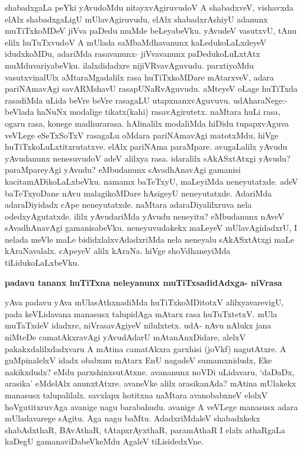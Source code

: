 \noindent
shabadxgaLa peYki yAvudoMdu nitayxvAgiruvudoV A shabadxveV, vishavxda elAlx shabadx\-gaLigU mUlavAgi\-ruvudu, elAlx shabadxrAshiyU adanunx muTiTxkoMDeV jiVva paDedu muMde beLeyabeVku. yAvudeV vasutxvU, tAnu elilx huTuTxvudoV A mUlada saMbaMdhavanunx kaLedukoLaLxdeyeV idudxkoMDu, ada\-riMda rasavanunx- jiVvavanunx paDedukoLuLxtAtx muMduvariyabeVku. ilalxdidadxre nijiVRvavAgu\-vudu. parxtiyoMdu vasutxvinalUlx aMtaraMgadalilx rasa huTiTxkoMDare mAtarxveV, adara pariNAmavAgi savARM\-shavU rasapUNaRvAguvudu. aMteyeV oLage huTiTxda rasadiMda uLida beVre beVre rasagaLU utapxnanx\-vAguvuvu. udAharaNege:- beVlada haNuNx modalige tikatx(kahi) rasavAgirutetx. naMtara huLi rasa, ogaru\- rasa, konege madhurarasa. hAlinalilx modaliMda hiDidu tupapxvAguva veVLege eSeTxSoTxV rasagaLu oMdara\- pariNAmavAgi matotxMdu, hiVge huTiTxkoLuLxtitxrutatxve. elAlx pariNAma paraMpare. avugaLalilx yAvudu yAvudanunx nenesuvudoV adeV alilxya rasa. idaralilx sAkASxtAtxgi yAvudu? paraMpareyAgi yAvu\-du? eMbudanunx sAvadhAnavAgi gamanisi kacitamADikoLaLxbeVku. namamx baTeTxyU, maLeyiMda neneyutatxde. adeV baTeTxyoDane nAvu malagikoMDare hAsigeyU neneyutatxde. AdariMda adaraDiyidadx cApe neneyutatxde. naMtara adaraDiyalilxruva nela odedxyAgutatxde. ililx yAvudariMda yAvudu nene\-yitu? eMbudanunx nAveV sAvadhAnavAgi gamanisabeVku. neneyuvudakekx maLeyeV mUlavAgidadxrU, I nelada meVle maLe bididxlalxvAdadxriMda nela neneyalu sAkASxtAtxgi maLe kAraNavalalx. cApeyeV alilx kAraNa. hiVge shoVdhaneyiMda tiLidukoLaLxbeVku.

{\bigskip
\noindent
{\large\bf padavu tananx huTiTxna neleyanunx muTiTxsadidAdxga- niVrasa}}\label{page182}
\medskip

\noindent
yAva padavu yAva mUlasAthxnadiMda huTiTxkoMDitotxV alilxyavarevigU, pada keVLidavana mana\-susx talupidAga mAtarx rasa huTuTxtetxV. mUla muTaTxdeV idadxre, niVrasavAgiyeV nilulxtetx. udA- nAvu nAlukx jana niMteDe camatAkxravAgi yAvudAdarU mAtanAnxDidare, alelxV pakakxdalilxdadxvaru A mAtina camatAkxra garxhisi (joVkf) nagutAtxre. A guMpinalelxV idadx obabxnu mAtarx EnU nagadeV sumamxnidudx, Eke nakikxdudx? eMdu parxshinxsutAtxne. avananunx noVDi uLidavaru, `daDaDx, arasika' eMdelAlx anunxtAtxre. avaneVke alilx arasikanAda? mAtina mUlakekx manasusx talupalilalx. savxlapx hotitxna naMtara avanobabxneV elolxV hoVgutitxruvAga avanige nagu barabahudu. avanige A veVLege manasusx adara mUladavarege sAgitu. Aga nagu baMtu. AdadxriMdaleV shabadxkekx shabAdxthaR, BAvAthaR, tAtapxrAyxthaR, paramAthaR I elalx athaRgaLa kaDegU gamanaviDabeVkeMdu AgaleV tiLisidedxVne.

